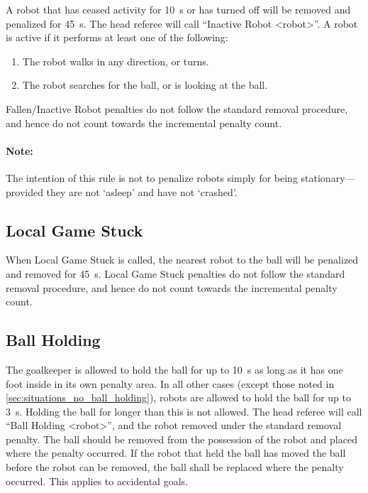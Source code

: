 A robot that has ceased activity for \qty{10}{\second} or has turned off will be removed and penalized for \qty{45}{\second}.
The head referee will call ``Inactive Robot \textless robot\textgreater''.
A robot is active if it performs at least one of the following:
\begin{enumerate}
  \item The robot walks in any direction, or turns.
  \item The robot searches for the ball, or is looking at the ball.
\end{enumerate}

Fallen/Inactive Robot penalties do not follow the standard removal procedure, and hence do not count towards the incremental penalty count.

\paragraph{Note:} The intention of this rule is not to penalize robots simply for being stationary---provided they are not `asleep' and have not `crashed'.

\subsection{Local Game Stuck}
\label{sec:pen_local_game_stuck}

When Local Game Stuck is called, the nearest robot to the ball will be penalized and removed for \qty{45}{\second}.
Local Game Stuck penalties do not follow the standard removal procedure, and hence do not count towards the incremental penalty count.

\subsection{Ball Holding}
\label{sec:ball_holding}

The goalkeeper is allowed to hold the ball for up to \qty{10}{\second} as long as it has one foot inside in its own penalty area.
In all other cases (except those noted in \cref{sec:situations_no_ball_holding}), robots are allowed to hold the ball for up to \qty{3}{\second}.
Holding the ball for longer than this is not allowed.
The head referee will call ``Ball Holding \textless robot\textgreater'', and the robot removed under the standard removal penalty.
The ball should be removed from the possession of the robot and placed where the penalty occurred.
If the robot that held the ball has moved the ball before the robot can be removed, the ball shall be replaced where the penalty occurred.
This applies to accidental goals.

